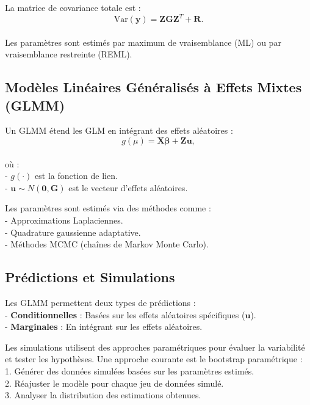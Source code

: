\documentclass[
]{article}
\begin{document}
La matrice de covariance totale est :\\
\[ \mathrm{Var}(\mathbf{y}) = \mathbf{Z} \mathbf{G} \mathbf{Z}^T + \mathbf{R}. \]\\
Les paramètres sont estimés par maximum de vraisemblance (ML) ou par
vraisemblance restreinte (REML).

\hypertarget{moduxe8les-linuxe9aires-guxe9nuxe9ralisuxe9s-uxe0-effets-mixtes-glmm}{%
\subsection{Modèles Linéaires Généralisés à Effets Mixtes
(GLMM)}\label{moduxe8les-linuxe9aires-guxe9nuxe9ralisuxe9s-uxe0-effets-mixtes-glmm}}

Un GLMM étend les GLM en intégrant des effets aléatoires :\\
\[ g(\mu) = \mathbf{X} \boldsymbol{\beta} + \mathbf{Z} \mathbf{u}, \]\\
où :\\
- \(g(\cdot)\) est la fonction de lien.\\
- \(\mathbf{u} \sim N(\mathbf{0}, \mathbf{G})\) est le vecteur d'effets
aléatoires.

Les paramètres sont estimés via des méthodes comme :\\
- Approximations Laplaciennes.\\
- Quadrature gaussienne adaptative.\\
- Méthodes MCMC (chaînes de Markov Monte Carlo).

\hypertarget{pruxe9dictions-et-simulations}{%
\subsection{Prédictions et
Simulations}\label{pruxe9dictions-et-simulations}}

Les GLMM permettent deux types de prédictions :\\
- \textbf{Conditionnelles} : Basées sur les effets aléatoires
spécifiques (\(\mathbf{u}\)).\\
- \textbf{Marginales} : En intégrant sur les effets aléatoires.

Les simulations utilisent des approches paramétriques pour évaluer la
variabilité et tester les hypothèses. Une approche courante est le
bootstrap paramétrique :\\
1. Générer des données simulées basées sur les paramètres estimés.\\
2. Réajuster le modèle pour chaque jeu de données simulé.\\
3. Analyser la distribution des estimations obtenues.
\end{document}
